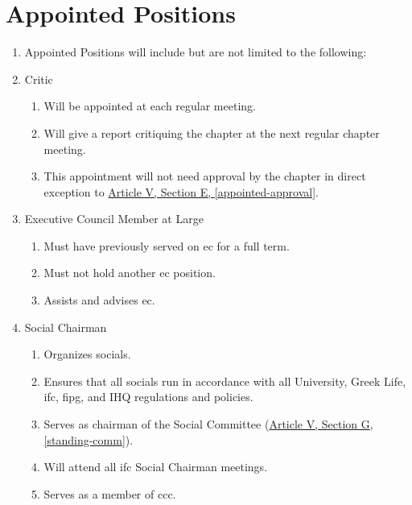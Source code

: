\section{Appointed Positions}
	\begin{enumerate}
		\item Appointed Positions will include but are not limited to the following:
				\item Critic
					\begin{enumerate}
						\item Will be appointed at each regular meeting.
						\item Will give a report critiquing the chapter at the next regular chapter meeting.
						\item This appointment will not need approval by the chapter in direct exception to \hyperref[appointed-approval]{Article V, Section E, \autoref*{appointed-approval}}.
					\end{enumerate}

                \item Executive Council Member at Large
					\begin{enumerate}
						\item Must have previously served on \gls{ec} for a full term.
						\item Must not hold another \gls{ec} position.
						\item Assists and advises \gls{ec}.
					\end{enumerate}
	
				\item Social Chairman
					\begin{enumerate}
						\item Organizes \glspl{social}.
						\item Ensures that all \glspl{social} run in accordance with all University, Greek Life, \gls{ifc}, \gls{fipg}, and IHQ regulations and policies.
						\item Serves as chairman of the Social Committee (\hyperref[standing-comm]{Article V, Section G, \autoref*{standing-comm}}).
						\item Will attend all \gls{ifc} Social Chairman meetings.
						\item Serves as a member of \gls{ccc}.
					\end{enumerate}


\end{enumerate}
